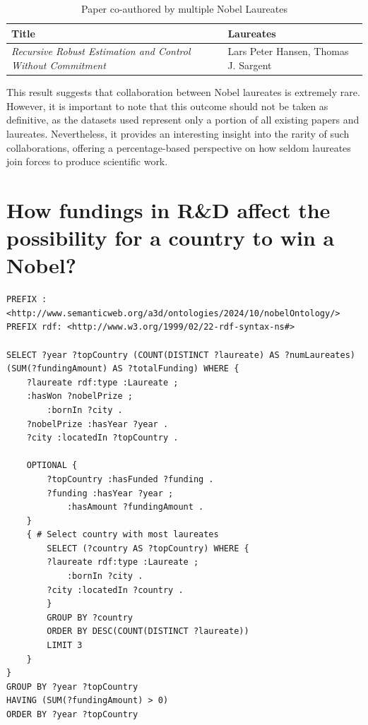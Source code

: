 \documentclass{article}
\begin{document}
\begin{table}[H]
	\caption{Paper co-authored by multiple Nobel Laureates}
	\centering
	\begin{tabular}{|l|l|}
		\hline
		\textbf{Title}                                                      & \textbf{Laureates}                   \\ \hline
		\textit{Recursive Robust Estimation and Control Without Commitment} & Lars Peter Hansen, Thomas J. Sargent \\ \hline
	\end{tabular}
	\label{tab:laureates_collaboration}
\end{table}

This result suggests that collaboration between Nobel laureates is extremely rare. However, it is important to
note that this outcome should not be taken as definitive, as the datasets used represent only a portion of all
existing papers and laureates. Nevertheless, it provides an interesting insight into the rarity of such
collaborations, offering a percentage-based perspective on how seldom laureates join forces to produce scientific
work.

\section{How fundings in R\&D affect the possibility for a country to win a Nobel?}

\begin{lstlisting}
PREFIX : <http://www.semanticweb.org/a3d/ontologies/2024/10/nobelOntology/>
PREFIX rdf: <http://www.w3.org/1999/02/22-rdf-syntax-ns#>

SELECT ?year ?topCountry (COUNT(DISTINCT ?laureate) AS ?numLaureates) (SUM(?fundingAmount) AS ?totalFunding) WHERE {
    ?laureate rdf:type :Laureate ;
  	:hasWon ?nobelPrize ;
        :bornIn ?city .
    ?nobelPrize :hasYear ?year .
    ?city :locatedIn ?topCountry .

    OPTIONAL {
        ?topCountry :hasFunded ?funding .
        ?funding :hasYear ?year ;
            :hasAmount ?fundingAmount .
    }
    { # Select country with most laureates
        SELECT (?country AS ?topCountry) WHERE {
        ?laureate rdf:type :Laureate ;
            :bornIn ?city .
        ?city :locatedIn ?country .
        }
        GROUP BY ?country
        ORDER BY DESC(COUNT(DISTINCT ?laureate))
        LIMIT 3
    }
}
GROUP BY ?year ?topCountry
HAVING (SUM(?fundingAmount) > 0)
ORDER BY ?year ?topCountry
\end{lstlisting}
\end{document}
